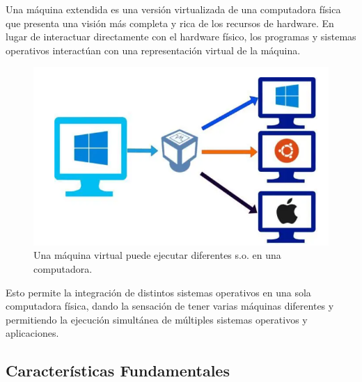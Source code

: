 Una máquina extendida es una versión virtualizada de una computadora física que presenta una visión más completa y rica de los recursos de hardware. En lugar de interactuar directamente con el hardware físico, los programas y sistemas operativos interactúan con una representación virtual de la máquina.

\begin{figure}[H]
	\centering
	\includegraphics[width=0.6\linewidth]{Imagenes/virtual.png}
	\caption{Una máquina virtual puede ejecutar diferentes s.o. en una computadora. }
	\label{fig:enter-label}
\end{figure}


 Esto permite la integración de distintos sistemas operativos en una sola computadora física, dando la sensación de tener varias máquinas diferentes y permitiendo la ejecución simultánea de múltiples sistemas operativos y aplicaciones.
 
\subsection{Características Fundamentales
}


